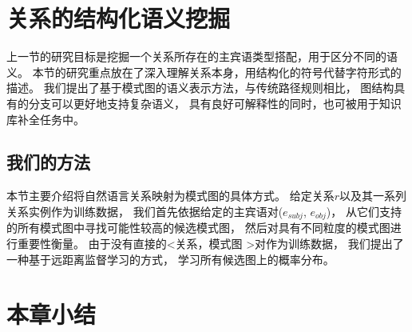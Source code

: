 
%




\section{关系的结构化语义挖掘}
\label{sec:schema}


上一节的研究目标是挖掘一个关系所存在的主宾语类型搭配，用于区分不同的语义。
本节的研究重点放在了深入理解关系本身，用结构化的符号代替字符形式的描述。
我们提出了基于模式图的语义表示方法，与传统路径规则相比，
图结构具有的分支可以更好地支持复杂语义，
具有良好可解释性的同时，也可被用于知识库补全任务中。






\subsection{我们的方法}
\label{sec:schema-approach}

本节主要介绍将自然语言关系映射为模式图的具体方式。
给定关系$r$以及其一系列关系实例作为训练数据，
我们首先依据给定的主宾语对($e_{subj}$, $e_{obj}$)，
从它们支持的所有模式图中寻找可能性较高的候选模式图，
然后对具有不同粒度的模式图进行重要性衡量。
由于没有直接的\textless 关系，模式图 \textgreater 对作为训练数据，
我们提出了一种基于远距离监督学习的方式，
学习所有候选图上的概率分布。







\section{本章小结}

